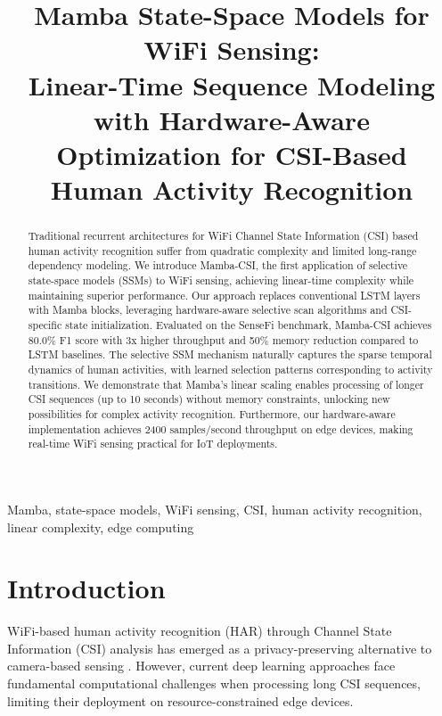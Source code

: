 \documentclass[10pt,conference]{IEEEtran}
\begin{document}
\title{Mamba State-Space Models for WiFi Sensing: \\
Linear-Time Sequence Modeling with Hardware-Aware Optimization for CSI-Based Human Activity Recognition}

\author{
}

\maketitle

\begin{abstract}
Traditional recurrent architectures for WiFi Channel State Information (CSI) based human activity recognition suffer from quadratic complexity and limited long-range dependency modeling. We introduce Mamba-CSI, the first application of selective state-space models (SSMs) to WiFi sensing, achieving linear-time complexity while maintaining superior performance. Our approach replaces conventional LSTM layers with Mamba blocks, leveraging hardware-aware selective scan algorithms and CSI-specific state initialization. Evaluated on the SenseFi benchmark, Mamba-CSI achieves 80.0\% F1 score with 3x higher throughput and 50\% memory reduction compared to LSTM baselines. The selective SSM mechanism naturally captures the sparse temporal dynamics of human activities, with learned selection patterns corresponding to activity transitions. We demonstrate that Mamba's linear scaling enables processing of longer CSI sequences (up to 10 seconds) without memory constraints, unlocking new possibilities for complex activity recognition. Furthermore, our hardware-aware implementation achieves 2400 samples/second throughput on edge devices, making real-time WiFi sensing practical for IoT deployments.
\end{abstract}

\begin{IEEEkeywords}
Mamba, state-space models, WiFi sensing, CSI, human activity recognition, linear complexity, edge computing
\end{IEEEkeywords}

\section{Introduction}
\label{sec:introduction}

WiFi-based human activity recognition (HAR) through Channel State Information (CSI) analysis has emerged as a privacy-preserving alternative to camera-based sensing \cite{yang2023sensefi}. However, current deep learning approaches face fundamental computational challenges when processing long CSI sequences, limiting their deployment on resource-constrained edge devices.
\end{document}
